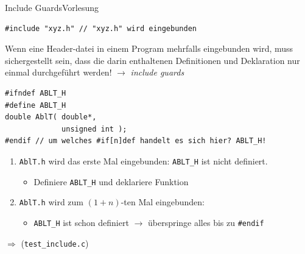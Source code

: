 \documentclass[xcolor=dvipsnames]{beamer}
\newcounter{lecturecounter}
\begin{document}
\begin{frame}[fragile]{Include Guards}{Vorlesung }
\begin{lstlisting}
#include "xyz.h" // "xyz.h" wird eingebunden
\end{lstlisting}
\begin{block}{}
  Wenn eine Header-datei in einem Program mehrfalls eingebunden wird, muss sichergestellt sein, dass die darin enthaltenen Definitionen und Deklaration nur einmal durchgeführt werden! $\rightarrow$ \emph{include guards}
\end{block}
\begin{lstlisting}
#ifndef ABLT_H
#define ABLT_H
double AblT( double*, 
             unsigned int );
#endif // um welches #if[n]def handelt es sich hier? ABLT_H!
\end{lstlisting}
\begin{block}{}
  \begin{enumerate}
    \item{\texttt{AblT.h} wird das erste Mal eingebunden: \verb|ABLT_H| ist nicht definiert.}
    \begin{itemize}
      \item{Definiere \verb|ABLT_H| und deklariere Funktion}
    \end{itemize}
    \item{\texttt{AblT.h} wird zum $(1+n)$-ten Mal eingebunden:}
    \begin{itemize}
      \item{\verb|ABLT_H| ist schon definiert $\rightarrow$ überspringe alles bis zu \texttt{\#endif}} 
    \end{itemize}
  \end{enumerate}
\end{block}
$\Rightarrow$ (\verb|test_include.c|)
\end{frame}
\end{document}
